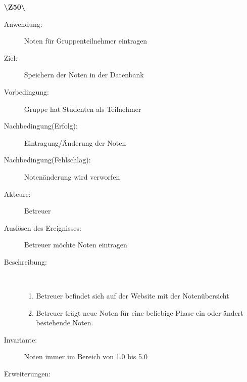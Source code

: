 \documentclass[a4paper]{article}
\begin{document}
\begin{enumerate}
  \pagebreak
  \item[\textbf{\textbackslash Z50\textbackslash}] \begin{description}
  	\item[Anwendung:] Noten für Gruppenteilnehmer eintragen
  	\item[Ziel:] Speichern der Noten in der Datenbank
  	\item[Vorbedingung:] Gruppe hat Studenten als Teilnehmer
  	\item[Nachbedingung(Erfolg):] Eintragung/Änderung der Noten
  	\item[Nachbedingung(Fehlschlag):] Notenänderung wird verworfen
  	\item[Akteure:] Betreuer
  	\item[Auslösen des Ereignisses:] Betreuer möchte Noten eintragen
  	\item[Beschreibung:]~
  	\begin{enumerate}[1.]
  	  \item Betreuer befindet sich auf der Website mit der Notenübersicht
  	  \item Betreuer trägt neue Noten für eine beliebige Phase ein oder ändert bestehende Noten.
  	\end{enumerate}
  	\item[Invariante:] Noten immer im Bereich von 1.0 bis 5.0
  	\item[Erweiterungen:]
  \end{description}
\end{enumerate}
\end{document}
